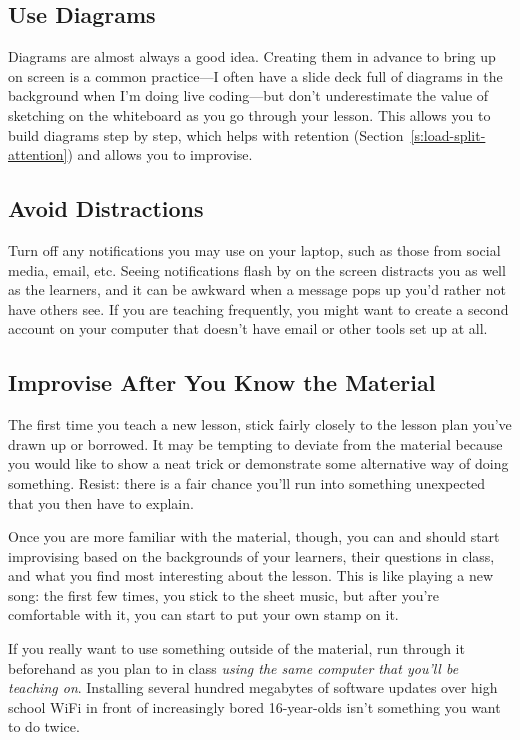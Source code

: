 \subsection{Use Diagrams}\label{use-diagrams}

Diagrams are almost always a good idea. Creating them in advance to
bring up on screen is a common practice---I often have a slide deck full
of diagrams in the background when I'm doing live coding---but don't
underestimate the value of sketching on the whiteboard as you go through
your lesson. This allows you to build diagrams step by step, which helps
with retention (Section~\ref{s:load-split-attention}) and allows you to
improvise.

\subsection{Avoid Distractions}\label{avoid-distractions}

Turn off any notifications you may use on your laptop, such as those
from social media, email, etc. Seeing notifications flash by on the
screen distracts you as well as the learners, and it can be awkward when
a message pops up you'd rather not have others see. If you are teaching
frequently, you might want to create a second account on your computer
that doesn't have email or other tools set up at all.

\subsection{Improvise After You Know the Material}\label{improvise-after-you-know-the-material}

The first time you teach a new lesson, stick fairly closely to the
lesson plan you've drawn up or borrowed. It may be tempting to deviate
from the material because you would like to show a neat trick or
demonstrate some alternative way of doing something. Resist: there is a
fair chance you'll run into something unexpected that you then have to
explain.

Once you are more familiar with the material, though, you can and should
start improvising based on the backgrounds of your learners, their
questions in class, and what you find most interesting about the lesson.
This is like playing a new song: the first few times, you stick to the
sheet music, but after you're comfortable with it, you can start to put
your own stamp on it.

If you really want to use something outside of the material, run through
it beforehand as you plan to in class \emph{using the same computer that
you'll be teaching on}. Installing several hundred megabytes of
software updates over high school WiFi in front of increasingly bored
16-year-olds isn't something you want to do twice.

